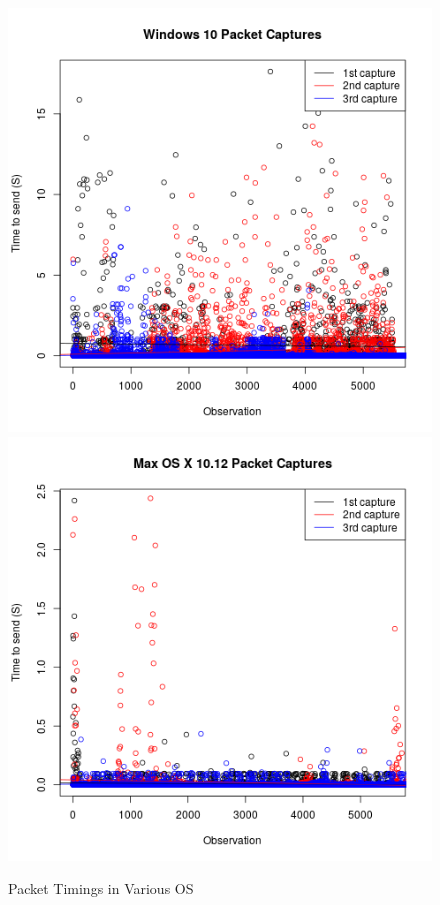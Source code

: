 \documentclass{IEEEtran}
\begin{document}
\begin{figure}[H]
\caption{Packet Timings in Various OS}
\begin{center}
\includegraphics[scale=0.3]{Neha2.png}
\includegraphics[scale=0.3]{Zeng2.png}

\end{center}
\end{figure}
\end{document}
